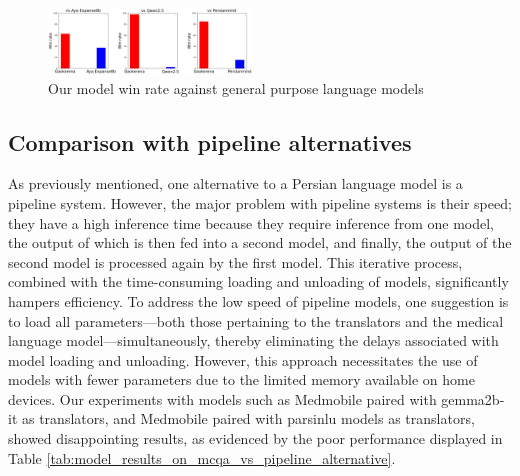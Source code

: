 \documentclass[conference]{IEEEtran}
\begin{document}
\begin{figure}[htbp]
	\centerline{\includegraphics[width=0.48\textwidth]{fig4.png}}
	\caption{Our model win rate against general purpose language models}
	\label{fig4}
\end{figure}
\subsection{Comparison with pipeline alternatives}
As previously mentioned, one alternative to a Persian language model is a pipeline system. However, the major problem with pipeline systems is their speed; they have a high inference time because they require inference from one model, the output of which is then fed into a second model, and finally, the output of the second model is processed again by the first model. This iterative process, combined with the time-consuming loading and unloading of models, significantly hampers efficiency. To address the low speed of pipeline models, one suggestion is to load all parameters—both those pertaining to the translators and the medical language model—simultaneously, thereby eliminating the delays associated with model loading and unloading. However, this approach necessitates the use of models with fewer parameters due to the limited memory available on home devices. Our experiments with models such as Medmobile \cite{b4} paired with gemma2b-it \cite{b4} as translators, and Medmobile paired with parsinlu \cite{b4} models as translators, showed disappointing results, as evidenced by the poor performance displayed in Table \ref{tab:model_results_on_mcqa_vs_pipeline_alternative}.
\end{document}
